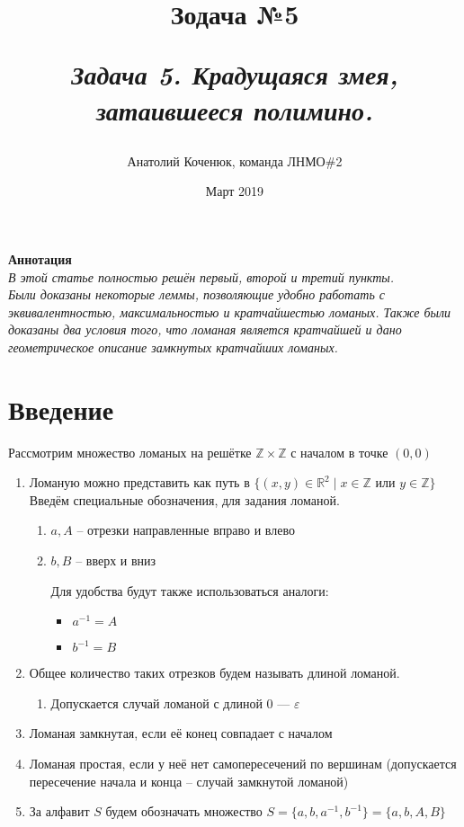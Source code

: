 \documentclass[12pt,a4paper, flushleft]{article}
\author{Анатолий Коченюк, команда ЛНМО\#2}
\date{Март 2019}
\title{Зодача \textsuperscript{\textregistered} №5}
\title{
	\vspace{4cm}	
	\horline{380}	
	\begin{center}
		\begin{Huge}
			\textbf{\emph{Задача 5. Крадущаяся змея, затаившееся полимино.}}
		\end{Huge}
	\end{center}	
	\vspace{-1.3cm}	
	\horline{400}
}
\begin{document}
\maketitle
\vspace{4cm}
	
	\begin{myquote}
	\begin{center}
		\textbf{Аннотация}\\
		\textit{
			В этой статье полностью решён первый, второй и третий пункты.\\
			Были доказаны некоторые леммы, позволяющие удобно работать с эквивалентностью, максимальностью и кратчайшестью ломаных.
			Также были доказаны два условия того, что ломаная является кратчайшей и дано геометрическое описание замкнутых кратчайших ломаных.
		}
	\end{center}
	\end{myquote}	
	
	\pagebreak

	\tableofcontents	
	
	\pagebreak

\section*{Введение}

Рассмотрим множество ломаных на решётке $\mathds{Z}\times \mathds{Z}$ с началом в точке $(0, 0)$

\begin{enumerate}
	\item Ломаную можно представить как путь в $\{(x, y)\in\mathds{R}^2\mid x\in \mathds{Z} \text{ или } y\in\mathds{Z}\}$
	Введём специальные обозначения, для задания ломаной.
	\begin{enumerate}
		\item[] $a, A$ -- отрезки направленные вправо и влево
		\item[] $b, B$ -- вверх и вниз
		
		Для удобства будут также использоваться аналоги:
		\begin{itemize}
			\item $a^{-1} = A$
			\item $b^{-1} = B$
		\end{itemize}
	\end{enumerate}
	\item Общее количество таких отрезков будем называть длиной ломаной.
	\begin{enumerate}
		\item []Допускается случай ломаной с длиной 0 --- $\varepsilon$
	\end{enumerate}
	\item Ломаная замкнутая, если её конец совпадает с началом
	\item Ломаная простая, если у неё нет самопересечений по вершинам (допускается пересечение начала и конца -- случай замкнутой ломаной)
	\item За алфавит $S$ будем обозначать множество $S = \{a, b, a^{-1}, b^{-1}\} = \{a, b, A, B\}$ 	
\end{enumerate}
\end{document}
